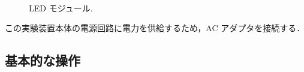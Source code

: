 \documentclass[11pt,sort]{jarticle}
\begin{document}
\begin{figure}[t]
\begin{minipage}[t]{.45\textwidth}
\begin{center}
\\
\caption{LED モジュール. }\label{fig:LED_module} 
\end{center}
\end{minipage}
\end{figure}

この実験装置本体の電源回路に電力を供給するため，AC アダプタを接続する．

\subsection{基本的な操作}
\end{document}
